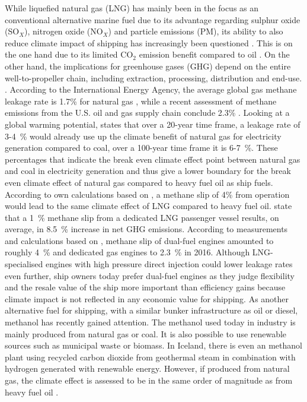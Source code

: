 \documentclass[article]{elsarticle}
\begin{document}
While liquefied natural gas (LNG) has mainly been in the focus as an conventional alternative marine fuel \cite{IMO2016a,DNVGL2015} due to its advantage regarding sulphur oxide (SO$_X$), nitrogen oxide (NO$_X$) and particle emissions (PM), its ability to also reduce climate impact of shipping has increasingly been questioned \cite{BRYNOLF2014b}. This is on the one hand due to its limited CO$_2$ emission benefit compared to oil \cite{DNVGL2014}. On the other hand, the implications for greenhouse gases (GHG) depend on the entire well-to-propeller chain, including extraction, processing, distribution and end-use. \cite{THOMSON2015}. According to the International Energy Agency, the average global gas methane leakage rate is 1.7\% for natural gas \cite{IEA2017}, while a recent assessment of methane emissions from the U.S. oil and gas supply chain conclude 2.3\% \cite{Alvarez2018}. Looking at a global warming potential, \citet{IEA2017} states that over a 20-year time frame, a leakage rate of 3-4~\% would already use up the climate benefit of natural gas for electricity generation compared to coal, over a 100-year time frame it is 6-7~\%. These percentages that indicate the break even climate effect point between natural gas and coal in electricity generation and thus give a lower boundary for the break even climate effect of natural gas compared to heavy fuel oil as ship fuels. According to own calculations based on \cite{BRYNOLF2014}, a methane slip of 4\% from operation would lead to the same climate effect of LNG compared to heavy fuel oil. \citet{HAGOS2018} state that a 1~\% methane slip from a dedicated LNG passenger vessel results, on average, in 8.5~\% increase in net GHG emissions. According to measurements and calculations based on \cite{Corbett2015,Stenersen2017}, methane slip of dual-fuel engines amounted to roughly 4~\% and dedicated gas engines to 2.3~\% in 2016. Although LNG-specialised engines with high pressure direct injection could lower leakage rates even further, ship owners today prefer dual-fuel engines as they judge flexibility and the resale value of the ship more important than efficiency gains because climate impact is not reflected in any economic value for shipping. As another alternative fuel for shipping, with a similar bunker infrastructure as oil or diesel, methanol has recently gained attention. The methanol used today in industry is mainly produced from natural gas or coal. It is also possible to use renewable sources such as municipal waste or biomass. In Iceland, there is even an methanol plant using recycled carbon dioxide from geothermal steam in combination with hydrogen generated with renewable energy. However, if produced from natural gas, the climate effect is assessed to be in the same order of magnitude as from heavy fuel oil \cite{BRYNOLF2014,DNVGL2018}. 
\end{document}
